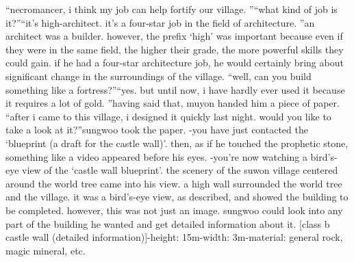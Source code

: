 “necromancer, i think my job can help fortify our village.
”“what kind of job is it?”“it’s high-architect.
 it’s a four-star job in the field of architecture.
”an architect was a builder.
 however, the prefix ‘high’ was important because even if they were in the same field, the higher their grade, the more powerful skills they could gain.
if he had a four-star architecture job, he would certainly bring about significant change in the surroundings of the village.
“well, can you build something like a fortress?”“yes.
 but until now, i have hardly ever used it because it requires a lot of gold.
”having said that, muyon handed him a piece of paper.
“after i came to this village, i designed it quickly last night.
 would you like to take a look at it?”sungwoo took the paper.
-you have just contacted the ‘blueprint (a draft for the castle wall)’.
then, as if he touched the prophetic stone, something like a video appeared before his eyes.
-you’re now watching a bird’s-eye view of the ‘castle wall blueprint’.
the scenery of the suwon village centered around the world tree came into his view.
 a high wall surrounded the world tree and the village.
it was a bird’s-eye view, as described, and showed the building to be completed.
however, this was not just an image.
 sungwoo could look into any part of the building he wanted and get detailed information about it.
[class b castle wall (detailed information)]-height: 15m-width: 3m-material: general rock, magic mineral, etc.


